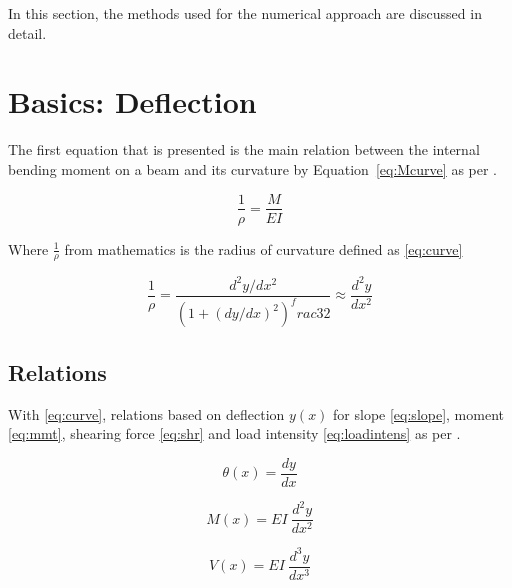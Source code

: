 \label{chapt:prelim}

In this section, the methods used for the numerical approach are discussed in detail.

\section{Basics: Deflection}

The first equation that is presented is the main relation between the internal bending moment on a beam and its curvature by Equation~\ref{eq:Mcurve} as per \citep{nisbett2014shigley}. 

\begin{equation}
	\label{eq:Mcurve}
	\frac{1}{\rho}=\frac{M}{EI}
\end{equation}

Where $\frac{1}{\rho}$ from mathematics is the radius of curvature defined as \ref{eq:curve}

\begin{equation}
	\label{eq:curve}
	\frac{1}{\rho}=\frac{d^2y/dx^2}{\left( 1 +(dy/dx)^2 \right)^frac{3}{2}} \approx \frac{d^2y}{dx^2}
\end{equation}

\subsection{Relations}

With \ref{eq:curve}, relations based on deflection $y(x)$ for slope \ref{eq:slope}, moment \ref{eq:mmt}, shearing force \ref{eq:shr} and load intensity \ref{eq:loadintens} as per \citep{nisbett2014shigley}.

\begin{equation}
	\label{eq:slope}
	\theta(x) = \frac{dy}{dx}
\end{equation}

\begin{equation}
	\label{eq:mmt}
	M(x) = EI\ \frac{d^2y}{dx^2}
\end{equation}

\begin{equation}
	\label{eq:shr}
	V(x) = EI\ \frac{d^3y}{dx^3}
\end{equation}

